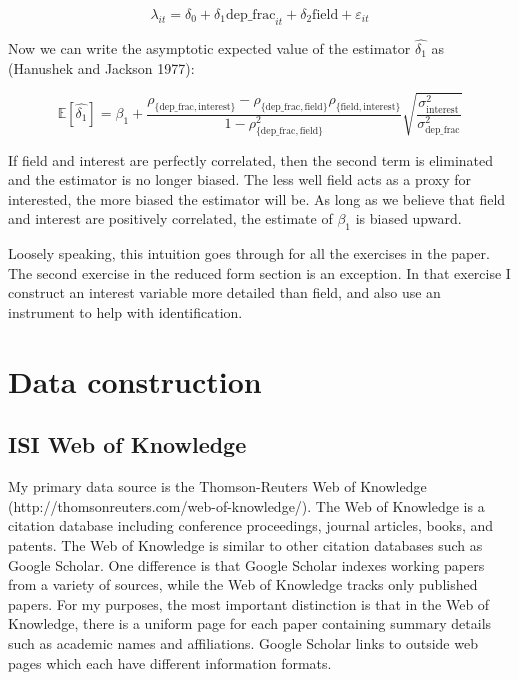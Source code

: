 \documentclass[]{article}
\begin{document}
\begin{equation}
    \lambda_{it} = \delta_0 + \delta_1 \mbox{dep\_frac}_{it} + \delta_2 \mbox{field} + \varepsilon_{it}
\end{equation}

Now we can write the asymptotic expected value of the estimator
$\hat{\delta_1}$ as (Hanushek and Jackson 1977):

\begin{equation}
    \mathbb{E}[\hat{\delta_1}] = \beta_1 + \frac{\rho_{\{\mbox{dep\_frac},\mbox{interest}\}} - \rho_{\{\mbox{dep\_frac},\mbox{field}\}}\rho_{\{\mbox{field},\mbox{interest}\}}}{1 - \rho_{\{\mbox{dep\_frac},\mbox{field}\}}^2} \sqrt{\frac{\sigma_{\mbox{interest}}^2}{\sigma_{\mbox{dep\_frac}}^2}}
\end{equation}

If field and interest are perfectly correlated, then the second term is
eliminated and the estimator is no longer biased. The less well field
acts as a proxy for interested, the more biased the estimator will be.
As long as we believe that field and interest are positively correlated,
the estimate of $\beta_1$ is biased upward.

Loosely speaking, this intuition goes through for all the exercises in
the paper. The second exercise in the reduced form section is an
exception. In that exercise I construct an interest variable more
detailed than field, and also use an instrument to help with
identification.

\section{Data construction}
\label{sec:dat_cons}

\subsection{ISI Web of Knowledge}

My primary data source is the Thomson-Reuters Web of Knowledge
(http://thomsonreuters.com/web-of-knowledge/). The Web of Knowledge is a
citation database including conference proceedings, journal articles,
books, and patents. The Web of Knowledge is similar to other citation
databases such as Google Scholar. One difference is that Google Scholar
indexes working papers from a variety of sources, while the Web of
Knowledge tracks only published papers. For my purposes, the most
important distinction is that in the Web of Knowledge, there is a
uniform page for each paper containing summary details such as academic
names and affiliations. Google Scholar links to outside web pages which
each have different information formats.
\end{document}
